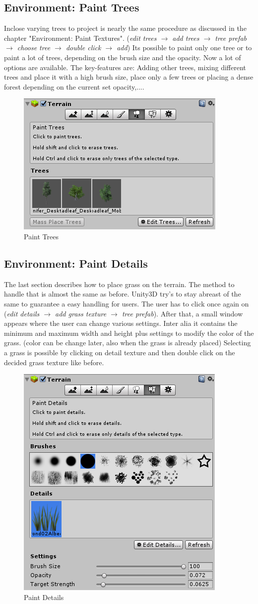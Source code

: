 \documentclass[conference]{IEEEtran}
\begin{document}
\subsection{Environment: Paint Trees}
Inclose varying trees to project is nearly the same procedure as discussed in the chapter "Environment: Paint Textures". (\emph{edit trees $\rightarrow$ add trees $\rightarrow$ tree prefab $\rightarrow$ choose tree $\rightarrow$ double click $\rightarrow$ add})
Its possible to paint only one tree or to paint a lot of trees, depending on the brush size and the opacity. Now a lot of options are available. The key-features are: Adding other trees, mixing different trees and place it with a high brush size, place only a few trees or placing a dense forest depending on the current set opacity,....


\begin{figure}[htbp]
  \includegraphics[width=.4\textwidth]{pictures/paint_trees}
  \caption{Paint Trees}
  \label{fig:paint_trees}
\end{figure}

\subsection{Environment: Paint Details}
The last section describes how to place grass on the terrain. The method to handle that is almost the same as before. Unity3D try’s to 
stay abreast of the same to guarantee a easy handling for users. The user has to click once again on (\emph{edit details $\rightarrow$ add grass texture $\rightarrow$ tree prefab}). After that, a small window appears where the user can change various settings. Inter alia it contains the minimum and maximum width and height plus settings to modify the color of the grass. (color can be change later, also when the grass is already placed) Selecting a grass is possible by clicking on detail texture and then double click on the decided grass texture like before. 


\begin{figure}[htbp]
  \includegraphics[width=.4\textwidth]{pictures/paint_details}
  \caption{Paint Details}
  \label{fig:paint_details}
\end{figure}
\end{document}
